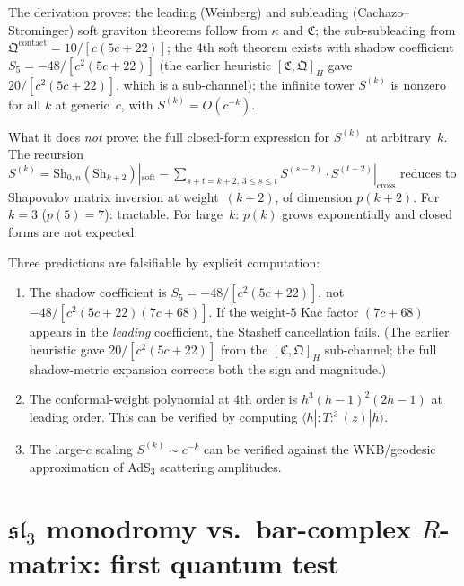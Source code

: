 \documentclass[11pt]{article}
\newcommand{\fsl}{\mathfrak{sl}}
\begin{document}
\begin{remark}
The derivation proves: the leading (Weinberg) and subleading (Cachazo--Strominger) soft graviton theorems follow from $\kappa$ and $\mathfrak{C}$; the sub-subleading from $\mathfrak{Q}^{\mathrm{contact}} = 10/[c(5c+22)]$; the 4th soft theorem exists with shadow coefficient $S_5 = -48/[c^2(5c+22)]$ (the earlier heuristic $[\mathfrak{C},\mathfrak{Q}]_H$ gave $20/[c^2(5c+22)]$, which is a sub-channel); the infinite tower $S^{(k)}$ is nonzero for all $k$ at generic~$c$, with $S^{(k)} = O(c^{-k})$.

What it does \emph{not} prove: the full closed-form expression for $S^{(k)}$ at arbitrary~$k$.  The recursion $S^{(k)} = \mathrm{Sh}_{0,n}(\mathrm{Sh}_{k+2})|_{\mathrm{soft}} - \sum_{s+t = k+2,\, 3 \le s \le t} S^{(s-2)} \cdot S^{(t-2)}|_{\mathrm{cross}}$ reduces to Shapovalov matrix inversion at weight~$(k+2)$, of dimension $p(k+2)$.  For $k = 3$ ($p(5) = 7$): tractable.  For large~$k$: $p(k)$ grows exponentially and closed forms are not expected.
\end{remark}

\begin{remark}
Three predictions are falsifiable by explicit computation:
\begin{enumerate}
\item The shadow coefficient is $S_5 = -48/[c^2(5c+22)]$, not $-48/[c^2(5c+22)(7c+68)]$.  If the weight-$5$ Kac factor $(7c+68)$ appears in the \emph{leading} coefficient, the Stasheff cancellation fails.  (The earlier heuristic gave $20/[c^2(5c+22)]$ from the $[\mathfrak{C},\mathfrak{Q}]_H$ sub-channel; the full shadow-metric expansion corrects both the sign and magnitude.)
\item The conformal-weight polynomial at 4th order is $h^3(h-1)^2(2h-1)$ at leading order.  This can be verified by computing $\langle h | {:}T{:}^3(z) | h \rangle$.
\item The large-$c$ scaling $S^{(k)} \sim c^{-k}$ can be verified against the WKB/geodesic approximation of AdS$_3$ scattering amplitudes.
\end{enumerate}
\end{remark}




\section{$\fsl_3$ monodromy vs.\ bar-complex $R$-matrix: first quantum test}
\label{sec:sl3-monodromy-test}
\end{document}
